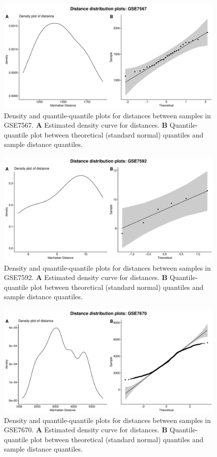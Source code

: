 \documentclass[10pt,letterpaper]{article}\usepackage[]{graphicx}\usepackage[]{color}
\begin{document}
\begin{figure}[H]
	\includegraphics[width=\textwidth]{manhattan-distance_hist_GSE7567.pdf}
	\caption{Density and quantile-quantile plots for distances between samples in GSE7567. \textbf{A} Estimated density curve for distances. \textbf{B} Quantile-quantile plot between theoretical (standard normal) quantiles and sample distance quantiles.}
\end{figure}

\begin{figure}[H]
	\includegraphics[width=\textwidth]{manhattan-distance_hist_GSE7592.pdf}
	\caption{Density and quantile-quantile plots for distances between samples in GSE7592. \textbf{A} Estimated density curve for distances. \textbf{B} Quantile-quantile plot between theoretical (standard normal) quantiles and sample distance quantiles.}
\end{figure}

\begin{figure}[H]
	\includegraphics[width=\textwidth]{manhattan-distance_hist_GSE7670.pdf}
	\caption{Density and quantile-quantile plots for distances between samples in GSE7670. \textbf{A} Estimated density curve for distances. \textbf{B} Quantile-quantile plot between theoretical (standard normal) quantiles and sample distance quantiles.}
\end{figure}
\end{document}

